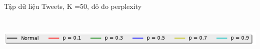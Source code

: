 \documentclass[pdf]{beamer}
\begin{document}
\begin{frame}{Tập dữ liệu Tweets, K =50, đô đo perplexity}
\begin{columns}[T]
\begin{column}{.50\textwidth}
\begin{figure}
		\end{figure}				
	\end{column} %
\end{columns}
\begin{center}
	\includegraphics[width=1\textwidth]{menu.png}	
\end{center}
\end{frame}
\end{document}
